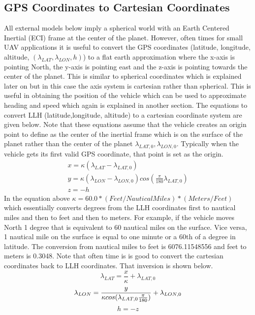 \documentclass{article}
\begin{document}
\subsection{GPS Coordinates to Cartesian Coordinates}

All external models below imply a spherical world with an Earth Centered Inertial (ECI) frame at the center of the planet. However, often times for small UAV applications it is useful to convert the GPS coordinates (latitude, longitude, altitude, $(\lambda_{LAT},\lambda_{LON},h)$) to a flat earth approximation where the x-axis is pointing North, the y-axis is pointing east and the z-axis is pointing towards the center of the planet. This is similar to spherical coordinates which is explained later on but in this case the axis system is cartesian rather than spherical. This is useful in obtaining the position of the vehicle which can be used to approximate heading and speed which again is explained in another section. The equations to convert LLH (latitude,longitude, altitude) to a cartesian coordinate system are given below. Note that these equations assume that the vehicle creates an origin point to define as the center of the inertial frame which is on the surface of the planet rather than the center of the planet $\lambda_{LAT,0},\lambda_{LON,0}$. Typically when the vehicle gets its first valid GPS coordinate, that point is set as the origin.
\begin{equation}
\begin{matrix}
x = \kappa (\lambda_{LAT} - \lambda_{LAT,0}) \\
y = \kappa (\lambda_{LON} - \lambda_{LON,0}) cos(\frac{\pi}{180}\lambda_{LAT,0}) \\
z = -h
\end{matrix}
\end{equation}
In the equation above $\kappa = 60.0*(Feet/NauticalMiles)*(Meters/Feet)$ which essentially converts degrees from the LLH coordinates first to nautical miles and then to feet and then to meters. For example, if the vehicle moves North 1 degree that is equivalent to 60 nautical miles on the surface. Vice versa, 1 nautical mile on the surface is equal to one minute or a 60th of a degree in latitude. The conversion from nautical miles to feet is 6076.11548556 and feet to meters is 0.3048. Note that often time is is good to convert the cartesian coordinates back to LLH coordinates. That inversion is shown below.
\begin{equation}
\lambda_{LAT} = \frac{x}{\kappa} + \lambda_{LAT,0}
\end{equation}
\begin{equation}
\lambda_{LON} = \frac{y}{\kappa cos(\lambda_{LAT,0} \frac{\pi}{180})} + \lambda_{LON,0}\\
\end{equation}
\begin{equation}
h = -z
\end{equation}
\end{document}
